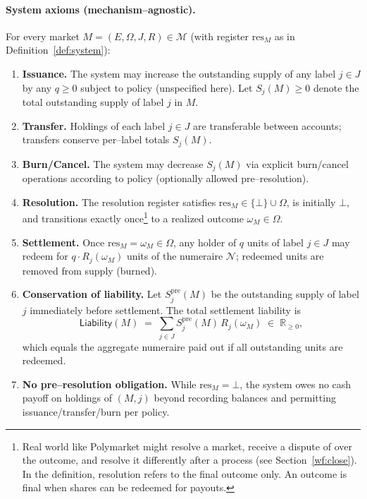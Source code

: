

\paragraph{System axioms (mechanism–agnostic).}
For every market $M=(E,\Omega,J,R)\in\mathcal{M}$ (with register $\mathrm{res}_M$ as in Definition~\ref{def:system}):

\begin{enumerate}
  \item \textbf{Issuance.} The system may increase the outstanding supply of any label $j\in J$ by any $q\ge 0$ subject to policy (unspecified here). Let $S_j(M)\ge 0$ denote the total outstanding supply of label $j$ in $M$.

  \item \textbf{Transfer.} Holdings of each label $j\in J$ are transferable between accounts; transfers conserve per–label totals $S_j(M)$.

  \item \textbf{Burn/Cancel.} The system may decrease $S_j(M)$ via explicit burn/cancel operations according to policy (optionally allowed pre–resolution).

  \item \textbf{Resolution.} The resolution register satisfies $\mathrm{res}_M\in\{\bot\}\cup\Omega$, is initially $\bot$, and transitions exactly once\footnote{Real world \depms like Polymarket might resolve a market, receive a dispute of over the outcome, and resolve it differently after a process (see Section~\ref{wf:close}). In the definition, resolution refers to the final outcome only. An outcome is final when shares can be redeemed for payouts.} to a realized outcome $\omega_M\in\Omega$.

  \item \textbf{Settlement.} Once $\mathrm{res}_M=\omega_M\in\Omega$, any holder of $q$ units of label $j\in J$ may redeem for $q\cdot R_j(\omega_M)$ units of the numeraire $\mathcal{N}$; redeemed units are removed from supply (burned).

  \item \textbf{Conservation of liability.} Let $S_j^{\mathrm{pre}}(M)$ be the outstanding supply of label $j$ immediately before settlement. The total settlement liability is
  \[
    \mathsf{Liability}(M)\;=\;\sum_{j\in J} S_j^{\mathrm{pre}}(M)\, R_j(\omega_M)\;\in\;\mathbb{R}_{\ge 0},
  \]
  which equals the aggregate numeraire paid out if all outstanding units are redeemed.

  \item \textbf{No pre–resolution obligation.} While $\mathrm{res}_M=\bot$, the system owes no cash payoff on holdings of $(M,j)$ beyond recording balances and permitting issuance/transfer/burn per policy.
\end{enumerate}






